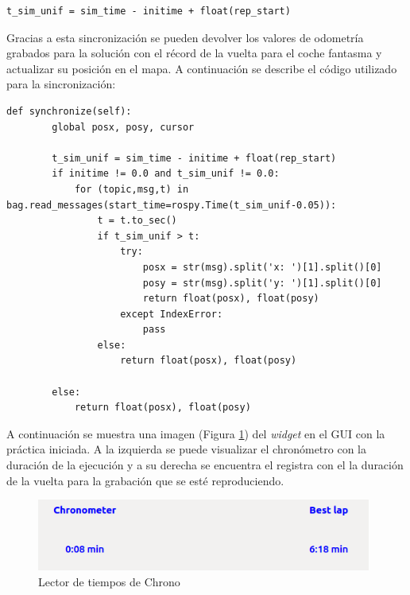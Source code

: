 \lstset{language=Python, breaklines=true, basicstyle=\footnotesize}
\begin{lstlisting}[frame=single]
t_sim_unif = sim_time - initime + float(rep_start)
\end{lstlisting}

Gracias a esta sincronización se pueden devolver los valores de odometría grabados para la solución con el récord de la vuelta para el coche fantasma y actualizar su posición en el mapa. A continuación se describe el código utilizado para la sincronización:

\lstset{language=Python, breaklines=true, basicstyle=\footnotesize}
\begin{lstlisting}[frame=single]
def synchronize(self):
        global posx, posy, cursor

        t_sim_unif = sim_time - initime + float(rep_start)
        if initime != 0.0 and t_sim_unif != 0.0:
            for (topic,msg,t) in bag.read_messages(start_time=rospy.Time(t_sim_unif-0.05)):
                t = t.to_sec()
                if t_sim_unif > t:
                    try:
                        posx = str(msg).split('x: ')[1].split()[0]
                        posy = str(msg).split('y: ')[1].split()[0]
                        return float(posx), float(posy)
                    except IndexError:
                        pass
                else:
                    return float(posx), float(posy)

        else:
            return float(posx), float(posy)
\end{lstlisting}

A continuación se muestra una imagen (Figura \ref{fig.ltch}) del \textit{widget} en el GUI con la práctica iniciada. A la izquierda se puede visualizar el chronómetro con la duración de la ejecución y a su derecha se encuentra el registra con el la duración de la vuelta para la grabación que se esté reproduciendo.

\begin{figure}[H]
  \begin{center}
    \includegraphics[width=0.98\textwidth]{figures/lector_tiempos_chrono.png}
		\caption{Lector de tiempos de Chrono}
		\label{fig.ltch}
		\end{center}
\end{figure}


